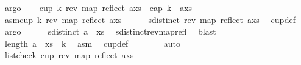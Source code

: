 \begin{isabellebody}
\ argo\isanewline
\ \ \isamarkupfalse%
\ {\isachardoublequoteopen}cup\ k\ {\isacharparenleft}{\kern0pt}rev\ {\isacharparenleft}{\kern0pt}map\ reflect\ {\isacharparenleft}{\kern0pt}a{\isacharhash}{\kern0pt}xs{\isacharparenright}{\kern0pt}{\isacharparenright}{\kern0pt}{\isacharparenright}{\kern0pt}\ {\isasymlongrightarrow}\ {\isacharparenleft}{\kern0pt}cap\ k\ \ {\isacharparenleft}{\kern0pt}a{\isacharhash}{\kern0pt}xs{\isacharparenright}{\kern0pt}{\isacharparenright}{\kern0pt}{\isachardoublequoteclose}\isanewline
\ \ \isamarkupfalse%
\isanewline
\ \ \ \ \isamarkupfalse%
\ asm{\isacharcolon}{\kern0pt}{\isachardoublequoteopen}cup\ k\ {\isacharparenleft}{\kern0pt}rev\ {\isacharparenleft}{\kern0pt}map\ reflect\ {\isacharparenleft}{\kern0pt}a{\isacharhash}{\kern0pt}xs{\isacharparenright}{\kern0pt}{\isacharparenright}{\kern0pt}{\isacharparenright}{\kern0pt}{\isachardoublequoteclose}\isanewline
\ \ \ \ \isamarkupfalse%
\ {\isachardoublequoteopen}sdistinct\ {\isacharparenleft}{\kern0pt}rev\ {\isacharparenleft}{\kern0pt}map\ reflect\ {\isacharparenleft}{\kern0pt}a{\isacharhash}{\kern0pt}xs{\isacharparenright}{\kern0pt}{\isacharparenright}{\kern0pt}{\isacharparenright}{\kern0pt}{\isachardoublequoteclose}\ \isamarkupfalse%
\ cup{\isacharunderscore}{\kern0pt}def\ \isamarkupfalse%
\ argo\isanewline
\ \ \ \ \isamarkupfalse%
\ {}{\isacharcolon}{\kern0pt}{\isachardoublequoteopen}sdistinct\ {\isacharparenleft}{\kern0pt}a\ {\isacharhash}{\kern0pt}\ xs{\isacharparenright}{\kern0pt}{\isachardoublequoteclose}\ \isamarkupfalse%
\ sdistinct{\isacharunderscore}{\kern0pt}rev{\isacharunderscore}{\kern0pt}map{\isacharunderscore}{\kern0pt}refl\ \isamarkupfalse%
\ blast\isanewline
\ \ \ \ \isamarkupfalse%
\ {}{\isacharcolon}{\kern0pt}{\isachardoublequoteopen}length\ {\isacharparenleft}{\kern0pt}a\ {\isacharhash}{\kern0pt}\ xs{\isacharparenright}{\kern0pt}\ {\isacharequal}{\kern0pt}\ k{\isachardoublequoteclose}\ \isamarkupfalse%
\ asm\ \isamarkupfalse%
\ cup{\isacharunderscore}{\kern0pt}def\isanewline
\ \ \ \ \ \ \isamarkupfalse%
\ auto\isanewline
\ \ \ \ \isamarkupfalse%
\ \isamarkupfalse%
\ {}{\isacharcolon}{\kern0pt}{\isachardoublequoteopen}list{\isacharunderscore}{\kern0pt}check\ cup{}\ {\isacharparenleft}{\kern0pt}rev\ {\isacharparenleft}{\kern0pt}map\ reflect\ {\isacharparenleft}{\kern0pt}a{\isacharhash}{\kern0pt}xs{\isacharparenright}{\kern0pt}{\isacharparenright}{\kern0pt}{\isacharparenright}{\kern0pt}{\isachardoublequoteclose}\isanewline

\end{isabellebody}

